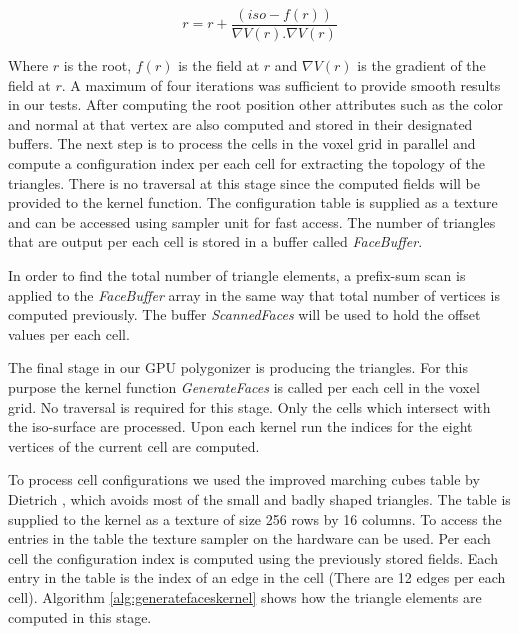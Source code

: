 \begin{equation}
 r = r + \frac{\left(iso - f(r)\right)}{\nabla V(r).\nabla V(r)}
\end{equation}

Where $r$ is the root, $f(r)$ is the field at $r$ and $\nabla V(r)$ is the gradient of the field at $r$.
A maximum of four iterations was sufficient to provide smooth results in our tests. 
After computing the root position other attributes such as the color and normal at that vertex are also computed and stored in their 
designated buffers. The next step is to process the cells in the voxel grid in parallel and compute a configuration index per each cell
for extracting the topology of the triangles. There is no \blob traversal at this stage since the computed fields will be provided
to the kernel function. The configuration table is supplied as a texture and can be accessed using sampler unit for 
fast access. The number of triangles that are output per each cell is stored in a buffer called \textit{FaceBuffer}.

In order to find the total number of triangle elements, a prefix-sum scan is applied to the \textit{FaceBuffer} array 
in the same way that total number of vertices is computed previously. The buffer \textit{ScannedFaces} will be used to hold the 
offset values per each cell. 

The final stage in our GPU polygonizer is producing the triangles. For this purpose the kernel function \textit{GenerateFaces} 
is called per each cell in the voxel grid. No \blob traversal is required for this stage. Only the cells which intersect with the 
iso-surface are processed. Upon each kernel run the indices for the eight vertices of the current cell are computed. 

To process cell configurations we used the improved marching cubes table by Dietrich \etal 
\cite{Dietrich2009}, which avoids most of the small and badly shaped triangles. The table is supplied to the kernel as 
a texture of size 256 rows by 16 columns. To access the entries in the table the texture sampler on the hardware 
can be used. Per each cell the configuration index is computed using the previously stored fields. Each entry in the table is the 
index of an edge in the cell (There are 12 edges per each cell). Algorithm \ref{alg:generatefaceskernel} shows how the 
triangle elements are computed in this stage.

